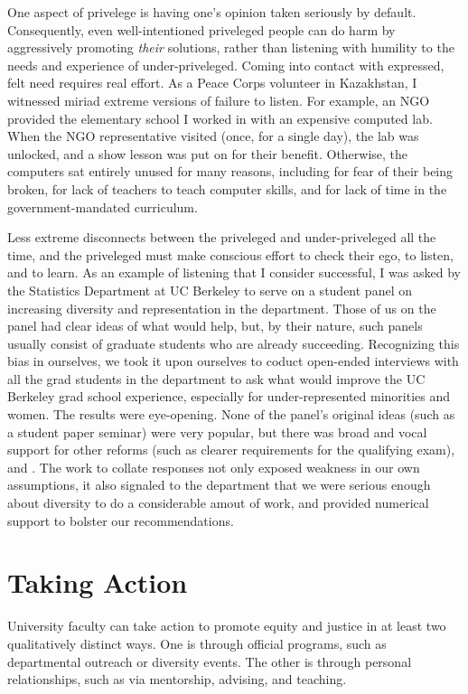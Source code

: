 One aspect of privelege is having one's opinion taken seriously by default.
Consequently, even well-intentioned priveleged people can do harm by
aggressively promoting \emph{their} solutions, rather than listening with
humility to the needs and experience of under-priveleged.  Coming into contact
with expressed, felt need requires real effort. As a Peace Corps volunteer in
Kazakhstan, I witnessed miriad extreme versions of failure to listen. For
example, an NGO provided the elementary school I worked in with an expensive
computed lab.  When the NGO representative visited (once, for a single day), the
lab was unlocked, and a show lesson was put on for their benefit.  Otherwise,
the computers sat entirely unused for many reasons, including for fear of their
being broken, for lack of teachers to teach computer skills, and for lack of
time in the government-mandated curriculum.

Less extreme disconnects between the priveleged and under-priveleged all the
time, and the priveleged must make conscious effort to check their ego, to
listen, and to learn.  As an example of listening that I consider successful, I
was asked by the Statistics Department at UC Berkeley to serve on a student
panel on increasing diversity and representation in the department.  Those of us
on the panel had clear ideas of what would help, but, by their nature, such
panels usually consist of graduate students who are already succeeding.
Recognizing this bias in ourselves, we took it upon ourselves to coduct
open-ended interviews with all the grad students in the department to ask what
would improve the UC Berkeley grad school experience, especially for
under-represented minorities and women. The results were eye-opening.  None of
the panel's original ideas (such as a student paper seminar) were very popular,
but there was broad and vocal support for other reforms (such as clearer
requirements for the qualifying exam), and . The work to collate responses not
only exposed weakness in our own assumptions, it also signaled to the department
that we were serious enough about diversity to do a considerable amout of work,
and provided numerical support to bolster our recommendations.




\section{Taking Action}

University faculty can take action to promote equity and justice in at least two
qualitatively distinct ways.  One is through official programs, such as
departmental outreach or diversity events.  The other is through personal
relationships, such as via mentorship, advising, and teaching.

